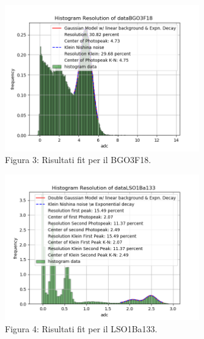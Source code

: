 \documentclass[a4paper]{article}
\begin{document}
\begin{figure}[H]
\centering
\includegraphics[width=0.75\textwidth]{histkleindataBGO3F18}
\caption{Figura 3: Risultati fit per il BGO3F18.}
\end{figure}
\begin{figure}[H]
\centering
\includegraphics[width=0.75\textwidth]{histkleindataLSO1Ba133}
\caption{Figura 4: Risultati fit per il LSO1Ba133.}
\end{figure}
\end{document}
